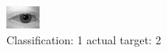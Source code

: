 \begin{figure}[h!]
\begin{center}
\includegraphics[width=0.60\columnwidth]{figures/ID373_class_1_target_2.png}
\end{center}
\caption{ Classification: 1 actual target: 2}
\label{fig:ID373_class_1_target_2}
\end{figure}
